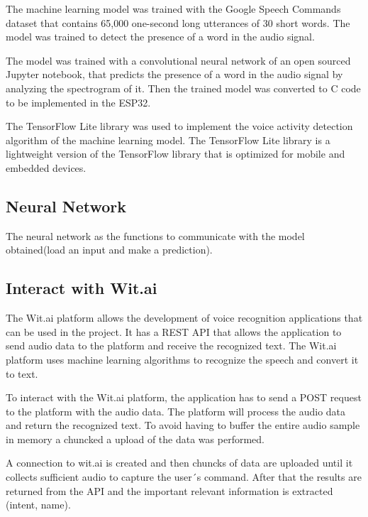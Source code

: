 The machine learning model was trained with the Google Speech Commands dataset that contains 65,000 one-second long utterances of 30 short words. The model was trained to detect the presence of a word in the audio signal. 

The model was trained with a convolutional neural network of an open sourced Jupyter notebook, that predicts the presence of a word in the audio signal by analyzing the spectrogram of it. Then the trained model was converted to C code to be implemented in the ESP32.

The TensorFlow Lite library was used to implement the voice activity detection algorithm of the machine learning model. The TensorFlow Lite library is a lightweight version of the TensorFlow library that is optimized for mobile and embedded devices. 

\subsection{Neural Network}

The neural network as the functions to communicate with the model obtained(load an input and make a prediction).

\subsection{Interact with Wit.ai}

The Wit.ai platform allows the development of voice recognition applications that can be used in the project. It has a REST API that allows the application to send audio data to the platform and receive the recognized text. The Wit.ai platform uses machine learning algorithms to recognize the speech and convert it to text. 

To interact with the Wit.ai platform, the application has to send a POST request to the platform with the audio data. The platform will process the audio data and return the recognized text. To avoid having to buffer the entire audio sample in memory a chuncked a upload of the data was performed.

A connection to wit.ai is created and then chuncks of data are uploaded until it collects sufficient audio to capture the user´s command. After that the results are returned from the API and the important relevant information is extracted (intent, name).


